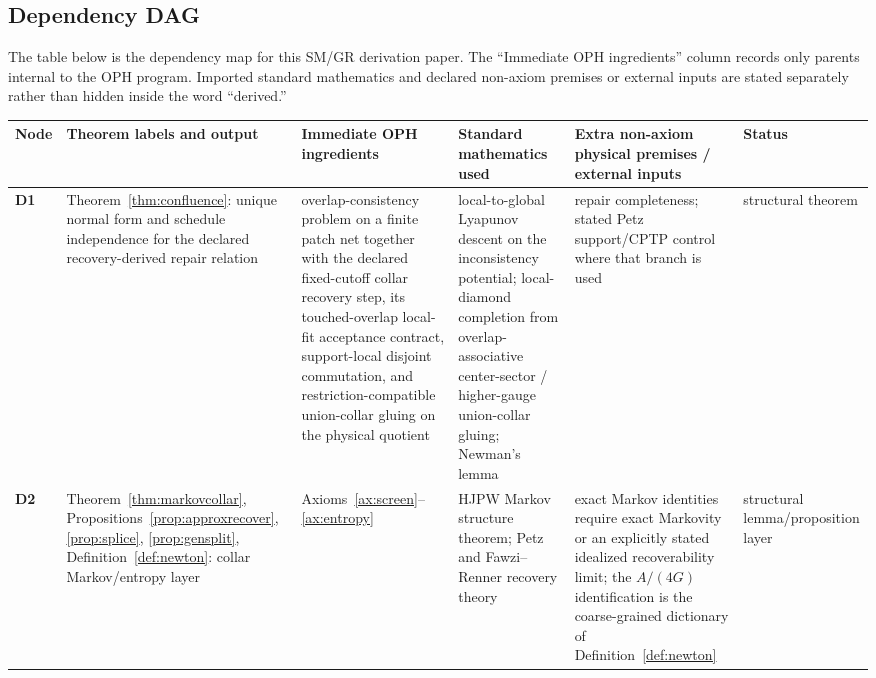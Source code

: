 \documentclass[11pt]{article}
\begin{document}
\subsection*{Dependency DAG}

The table below is the dependency map for this SM/GR derivation paper. The ``Immediate OPH ingredients'' column records only parents internal to the OPH program. Imported standard mathematics and declared non-axiom premises or external inputs are stated separately rather than hidden inside the word ``derived.''

\begingroup
\scriptsize
\setlength{\tabcolsep}{1pt}
\begin{longtable}{@{}>{\raggedright\arraybackslash}p{}>{\raggedright\arraybackslash}p{}>{\raggedright\arraybackslash}p{}>{\raggedright\arraybackslash}p{}>{\raggedright\arraybackslash}p{}>{\raggedright\arraybackslash}p{}@{}}
\toprule
Node & Theorem labels and output & Immediate OPH ingredients & Standard mathematics used & Extra non-axiom physical premises / external inputs & Status \\
\midrule
\endhead
\bottomrule
\endfoot
\textbf{D1} & Theorem~\ref{thm:confluence}: unique normal form and schedule independence for the declared recovery-derived repair relation & overlap-consistency problem on a finite patch net together with the declared fixed-cutoff collar recovery step, its touched-overlap local-fit acceptance contract, support-local disjoint commutation, and restriction-compatible union-collar gluing on the physical quotient & local-to-global Lyapunov descent on the inconsistency potential; local-diamond completion from overlap-associative center-sector / higher-gauge union-collar gluing; Newman's lemma & repair completeness; stated Petz support/CPTP control where that branch is used & structural theorem \\
\textbf{D2} & Theorem~\ref{thm:markovcollar}, Propositions~\ref{prop:approxrecover}, \ref{prop:splice}, \ref{prop:gensplit}, Definition~\ref{def:newton}: collar Markov/entropy layer & Axioms~\ref{ax:screen}--\ref{ax:entropy} & HJPW Markov structure theorem; Petz and Fawzi--Renner recovery theory & exact Markov identities require exact Markovity or an explicitly stated idealized recoverability limit; the \(A/(4G)\) identification is the coarse-grained dictionary of Definition~\ref{def:newton} & structural lemma/\newline proposition layer \\

\end{longtable}
\end{document}
